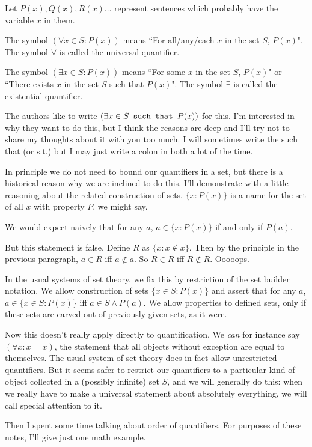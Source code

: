 \documentclass[12pt]{article}
\begin{document}
Let $P(x), Q(x), R(x)\ldots$ represent sentences which probably have the variable $x$ in them.

The symbol $(\forall x \in S:P(x))$  means ``For all/any/each $x$ in the set $S$, $P(x)$".  The symbol $\forall$ is called the universal quantifier.

The symbol $(\exists x \in S:P(x))$ means ``For some $x$ in the set $S$, $P(x)$" or ``There exists $x$ in the set $S$ such that $P(x)$".  The symbol $\exists$ is called the existential quantifier.

 The authors like to write $(\exists x \in S \verb| such that |P(x))$ for this.  I'm interested in why they want to do this, but I think the reasons are deep and I'll try not to share my thoughts about it with you too much.  I will sometimes write the such that (or s.t.) but I may just write a colon in both a lot of the time.

In principle we do not need to bound our quantifiers in a set, but there is a historical reason why we are inclined to do this.  I'll demonstrate with a little reasoning about the related construction of sets.  $\{x : P(x)\}$ is a name for the set of all $x$ with property $P$, we might say.

We would expect naively that for any $a$, $a \in \{x:P(x)\}$ if and only if $P(a)$.  

But this statement is false.  Define $R$ as $\{x: x \not\in x\}$.  Then by the principle in the previous paragraph,
$a \in R$ iff $a \not\in a$.  So $R \in R$ iff $R \not\in R$.  Ooooops.

In the usual systems of set theory, we fix this by restriction of the set builder notation.  We allow construction of sets $\{x \in S:P(x)\}$ and assert that for any $a$, $a \in \{x \in S:P(x)\}$ iff $a \in S \wedge P(a)$.  We allow properties to defined sets, only if these sets are carved out of previously given sets, as it were.

Now this doesn't really apply directly to quantification.  We {\em can\/} for instance say $(\forall x:x=x)$, the statement that all objects without exception are equal to themselves.  The usual system of set theory does in fact allow unrestricted quantifiers.  But it seems safer to restrict our quantifiers to a particular kind of object collected in a (possibly infinite) set $S$, and we will generally do this:  when we really have to make a universal statement about absolutely everything, we will call special attention to it.

Then I spent some time talking about order of quantifiers.  For purposes of these notes, I'll give just one math example.
\end{document}
